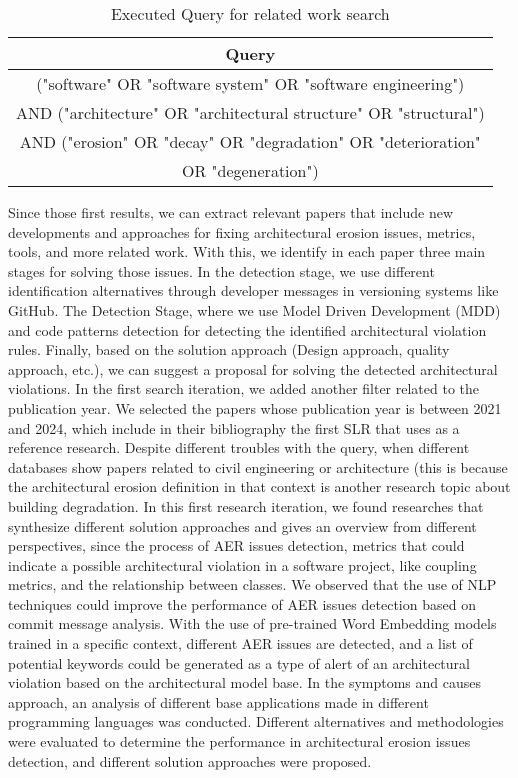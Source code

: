 \begin{table}[H]
    \centering
    \begin{tabular}{|c|}
        \hline
        Query\\
         \hline
             ("software" OR "software system" OR "software engineering") \\
             AND ("architecture" OR "architectural structure" OR "structural") \\
             AND ("erosion" OR "decay" OR "degradation" OR "deterioration"\\
             OR "degeneration") \\
         \hline
    \end{tabular}
    \caption{Executed Query for related work search}
    \label{tab:my_label}
\end{table}

Since those first results, we can extract relevant papers that include new developments and approaches for fixing architectural erosion issues, metrics, tools, and more related work. With this, we identify in each paper three main stages for solving those issues. In the detection stage, we use different identification alternatives through developer messages in versioning systems like GitHub. The Detection Stage, where we use Model Driven Development (MDD) and code patterns detection for detecting the identified architectural violation rules. Finally, based on the solution approach (Design approach, quality approach, etc.), we can suggest a proposal for solving the detected architectural violations.
In the first search iteration, we added another filter related to the publication year. We selected the papers whose publication year is between 2021 and 2024, which include in their bibliography the first SLR that uses as a reference research. Despite different troubles with the query, when different databases show papers related to civil engineering or architecture (this is because the architectural erosion definition in that context is another research topic about building degradation. In this first research iteration, we found researches that synthesize different solution approaches and gives an overview from different perspectives, since the process of AER issues detection, metrics that could indicate a possible architectural violation in a software project, like coupling metrics, and the relationship between classes.
We observed that the use of NLP techniques could improve the performance of AER issues detection based on commit message analysis. With the use of pre-trained Word Embedding models trained in a specific context, different AER issues are detected, and a list of potential keywords could be generated as a type of alert of an architectural violation based on the architectural model base.
In the symptoms and causes approach, an analysis of different base applications made in different programming languages was conducted. Different alternatives and methodologies were evaluated to determine the performance in architectural erosion issues detection, and different solution approaches were proposed.

